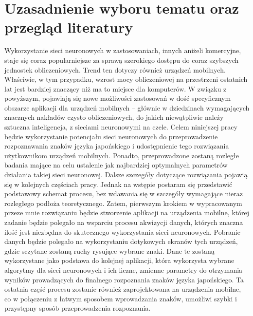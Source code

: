 \section{Uzasadnienie wyboru tematu oraz przegląd literatury}
\iffalse
W tym podrozdziale należy szczegółowo uzasadnić dlaczego wybrany został taki a~nie inny temat pracy. Trzeba przede wszystkim zaprezentować aktualny stan wiedzy w~danej dziedzinie. Oznacza to konieczność omówienia książek (ew. artykułów naukowych bądź dokumentacji technicznej) z~których będzie się korzystać w~trakcie rozprawy. Następnie należy wskazać -- tym razem już konkretnie -- co nowego zamierza się zrobić. Podstawowymi celami tego podrozdziału jest wprowadzenie czytelnika w~aktualny stand danej dziedziny i~przekonanie go, że naprawdę warto zajmować się podjętym tematem.

{\color{red} Tutaj niestety będę potrzebował więcej czasu aby odświeżyć znajomość literatury, gdyż przez ten okres czasu przestałem być na bieżąco.}
\fi

Wykorzystanie sieci neuronowych w zastosowaniach, innych aniżeli komercyjne, staje się coraz popularniejsze za sprawą szerokiego dostępu do coraz szybszych jednostek obliczeniowych. Trend ten dotyczy również urządzeń mobilnych. Właściwie, w tym przypadku, wzrost mocy obliczeniowej na przestrzeni ostatnich lat jest bardziej znaczący niż ma to miejsce dla komputerów. W związku z powyższym, pojawiają się nowe możliwości zastosowań w dość specyficznym obszarze aplikacji dla urządzeń mobilnych -- głównie w dziedzinach wymagających znacznych nakładów czysto obliczeniowych, do jakich niewątpliwie należy sztuczna inteligencja, z sieciami neuronowymi na czele. Celem niniejszej pracy będzie wykorzystanie potencjału sieci neuronowych do przeprowadzenie rozpoznawania znaków języka japońskiego i udostępnienie tego rozwiązania użytkownikom urządzeń mobilnych. Ponadto, przeprowadzone zostaną rozległe badania mające na celu ustalenie jak najbardziej optymalnych parametrów działania takiej sieci neuronowej. Dalsze szczegóły dotyczące rozwiązania pojawią się w kolejnych częściach pracy. Jednak na wstępie postaram się przedstawić podstawowy schemat procesu, bez wdawania się w szczegóły wymagające nieraz rozległego podłoża teoretycznego. Zatem, pierwszym krokiem w wypracowanym przeze mnie rozwiązaniu będzie stworzenie aplikacji na urządzenia mobilne, której zadanie będzie polegało na wsparciu procesu akwizycji danych, których znaczna ilość jest niezbędna do skutecznego wykorzystania sieci neuronowych. Pobranie danych będzie polegało na wykorzystaniu dotykowych ekranów tych urządzeń, gdzie sczytane zostaną ruchy rysujące wybrane znaki. Dane te zostaną wykorzystane jako podstawa do kolejnej aplikacji, która wykorzysta wybrane algorytmy dla sieci neuronowych i ich liczne, zmienne parametry do otrzymania wyników prowadzących do finalnego rozpoznania znaków języka japońskiego. Ta ostatnia część procesu zostanie również zaprojektowana na urządzenia mobilne, co w połączeniu z łatwym sposobem wprowadzania znaków, umożliwi szybki i przystępny sposób przeprowadzenia rozpoznania.

